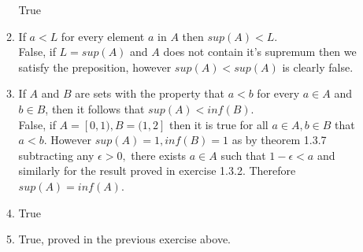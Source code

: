 \documentclass[12pt, letterpaper]{article}
\begin{document}
\begin{enumerate}
\begin{enumerate}
		True
		\item If $a < L$ for every element $a$ in $A$ then $sup(A) < L$.\\
		False, if $L = sup(A)$ and $A$ does not contain it's supremum then we satisfy the preposition, however $sup(A) < sup(A)$ is clearly false.  
		\item If $A$ and $B$ are sets with the property that $a < b$ for every $a \in A$ and $b \in B$, then it follows that $sup(A) < inf(B)$.  \\
		False, if $A = [0,1), B = (1,2]$ then it is true for all $a \in A, b \in B$ that $a < b$.  However $sup(A) = 1, inf (B) = 1$ as by theorem 1.3.7 subtracting any $\epsilon > 0,$ there exists $a \in A$ such that  $1 - \epsilon < a$ and similarly for the result proved in exercise 1.3.2.  Therefore $sup(A) = inf(A)$.  
		\item True
		\item True, proved in the previous exercise above.  
	\end{enumerate}
\end{enumerate}
\end{document}
